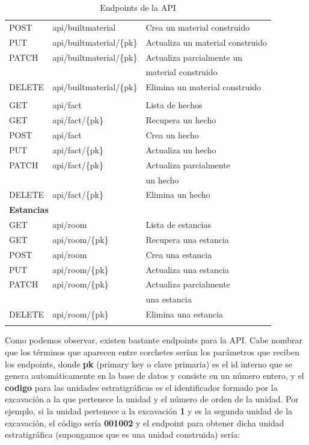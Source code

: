 \begin{longtable}[H]{|l|l|l|}
    POST & api/builtmaterial & Crea un material construido \\
    PUT & api/builtmaterial/\{pk\} & Actualiza un material construido \\
    PATCH & api/builtmaterial/\{pk\} & Actualiza parcialmente un \\
    &  & material construido \\
    DELETE & api/builtmaterial/\{pk\} & Elimina un material construido \\
    \hline\hline
    \newpage
    \multicolumn{3}{|l|}{\textbf{Hechos}} \\
    \hline
    GET & api/fact & Lista de hechos \\
    GET & api/fact/\{pk\} & Recupera un hecho \\
    POST & api/fact & Crea un hecho \\
    PUT & api/fact/\{pk\} & Actualiza un hecho \\
    PATCH & api/fact/\{pk\} & Actualiza parcialmente \\
    &  & un hecho \\
    DELETE & api/fact/\{pk\} & Elimina un hecho \\
    \hline\hline
    \multicolumn{3}{|l|}{\textbf{Estancias}} \\
    \hline
    GET & api/room & Lista de estancias \\
    GET & api/room/\{pk\} & Recupera una estancia \\
    POST & api/room & Crea una estancia \\
    PUT & api/room/\{pk\} & Actualiza una estancia \\
    PATCH & api/room/\{pk\} & Actualiza parcialmente \\
    &  & una estancia \\
    DELETE & api/room/\{pk\} & Elimina una estancia \\
    \hline

    \caption{Endpoints de la API}
    \label{tab:endpoints}
\end{longtable}

Como podemos observar, existen bastante endpoints para la API. Cabe nombrar que los
términos que aparecen entre corchetes serían los parámetros que reciben los endpoints,
donde \textbf{pk} (primary key o clave primaria) es el id interno que se genera
automáticamente en la base de datos y consiste en un número entero, y el \textbf{codigo}
para las unidades estratigráficas es el identificador formado por la excavación a la
que pertenece la unidad y el número de orden de la unidad. Por ejemplo, si la unidad
pertenece a la excavación \textbf{1} y es la segunda unidad de la excavación, el código
sería \textbf{001002} y el endpoint para obtener dicha unidad estratigráfica (supongamos
que es una unidad construida) sería:

